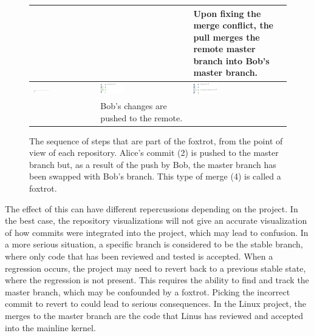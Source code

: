 \begin{figure}[htbp]
\begin{tabulary}{\textwidth}{LLL}
    &
    &
    \tiny{Upon fixing the merge conflict, the pull merges the remote master
    branch into Bob's master branch.}
    \\\hline

    \includegraphics[width=0.27\textwidth]{Figures/background/foxtrot/alice_3.png} &
    \includegraphics[width=0.27\textwidth]{Figures/background/foxtrot/origin_3.png} &
    \includegraphics[width=0.27\textwidth]{Figures/background/foxtrot/bob_4.png} \\

    &
    \tiny{Bob's changes are pushed to the remote.}
    &
    \\\hline

  \end{tabulary}
  \caption{The sequence of steps that are part of the foxtrot, from the
  point of view of each repository. Alice's commit (2) is pushed to the
  master branch but, as a result of the push by Bob, the master branch
  has been swapped with Bob's branch. This type of merge (4) is called a
  foxtrot.}
  \label{fig:FoxtrotSteps}
\end{figure}

The effect of this can have different repercussions depending on the
project.
In the best case, the repository visualizations will not give an
accurate visualization of how commits were integrated into the project,
which may lead to confusion.
In a more serious situation, a specific branch is considered to be the
stable branch, where only code that has been reviewed and tested is
accepted.
When a regression occurs, the project may need to revert back to a
previous stable state, where the regression is not present.
This requires the ability to find and track the master branch, which may
be confounded by a foxtrot.
Picking the incorrect commit to revert to could lead to serious
consequences.
In the Linux project, the merges to the master branch are
the code that Linus has reviewed and accepted into the mainline kernel.

